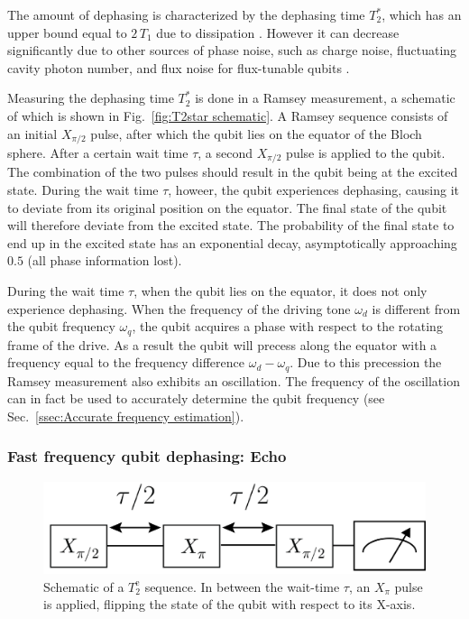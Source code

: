           The amount of dephasing is characterized by the dephasing time $T_2^*$, which has an upper bound equal to $2\,T_1$ due to dissipation \cite[pp56-58]{Bishop}. However it can decrease significantly due to other sources of phase noise, such as charge noise, fluctuating cavity photon number, and flux noise for flux-tunable qubits \cite[p126]{Sears}.

          Measuring the dephasing time $T_2^*$ is done in a Ramsey measurement, a schematic of which is shown in Fig.~\ref{fig:T2star schematic}. A Ramsey sequence consists of an initial $X_{\pi/2}$ pulse, after which the qubit lies on the equator of the Bloch sphere. After a certain wait time $\tau$, a second $X_{\pi/2}$ pulse is applied to the qubit. The combination of the two pulses should result in the qubit being at the excited state. During the wait time $\tau$, howeer, the qubit experiences dephasing, causing it to deviate from its original position on the equator. The final state of the qubit will therefore deviate from the  excited state. The probability of the final state to end up in the excited state has an exponential decay, asymptotically approaching $0.5$ (all phase information lost).

          During the wait time $\tau$, when the qubit lies on the equator, it does not only experience dephasing. When the frequency of the driving tone $\omega_d$ is different from the qubit frequency $\omega_q$, the qubit acquires a phase with respect to the rotating frame of the drive. As a result the qubit will precess along the equator with a frequency equal to the frequency difference $\omega_d - \omega_q$. Due to this precession the Ramsey measurement also exhibits an oscillation. The frequency of the oscillation can in fact be used to accurately determine the qubit frequency (see Sec.~\ref{ssec:Accurate frequency estimation}).

        \subsubsection{Fast frequency qubit dephasing: Echo}

          \begin{figure}
            \begin{center}
            \vspace{-30pt}
              \includegraphics[width=\textwidth]{Figures/Qubit characterization/T2echo decoherence.png}
            \end{center}
            \vspace{-20 pt}
            \caption{Schematic of a $T_2^\text{e}$ sequence. In between the wait-time $\tau$, an $X_\pi$ pulse is applied, flipping the state of the qubit with respect to its X-axis.}
            \label{fig:T2echo schematic}
          \end{figure}

